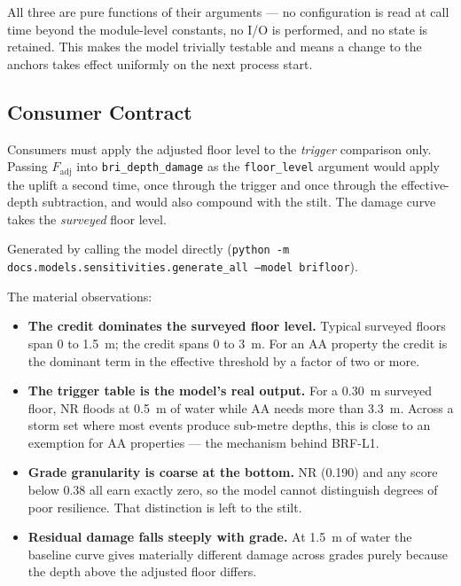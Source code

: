 \documentclass[11pt,a4paper]{article}
\begin{document}
All three are pure functions of their arguments --- no configuration is read at
call time beyond the module-level constants, no I/O is performed, and no state
is retained. This makes the model trivially testable and means a change to the
anchors takes effect uniformly on the next process start.

\subsection{Consumer Contract}
Consumers must apply the adjusted floor level to the \emph{trigger} comparison
only. Passing $F_{\text{adj}}$ into \texttt{bri\_depth\_damage} as the
\texttt{floor\_level} argument would apply the uplift a second time, once
through the trigger and once through the effective-depth subtraction, and would
also compound with the stilt. The damage curve takes the \emph{surveyed} floor
level.

\mkmsensitivity
\label{sec:sensitivity}

Generated by calling the model directly
(\texttt{python -m docs.models.sensitivities.generate\_all --model brifloor}).

The material observations:

\begin{itemize}
  \item \textbf{The credit dominates the surveyed floor level.} Typical surveyed
        floors span 0 to 1.5~m; the credit spans 0 to 3~m. For an AA property
        the credit is the dominant term in the effective threshold by a factor
        of two or more.
  \item \textbf{The trigger table is the model's real output.} For a 0.30~m
        surveyed floor, NR floods at 0.5~m of water while AA needs more than
        3.3~m. Across a storm set where most events produce sub-metre depths,
        this is close to an exemption for AA properties --- the mechanism behind
        BRF-L1.
  \item \textbf{Grade granularity is coarse at the bottom.} NR (0.190) and any
        score below 0.38 all earn exactly zero, so the model cannot distinguish
        degrees of poor resilience. That distinction is left to the stilt.
  \item \textbf{Residual damage falls steeply with grade.} At 1.5~m of water the
        baseline curve gives materially different damage across grades purely
        because the depth above the adjusted floor differs.
\end{itemize}
\end{document}
